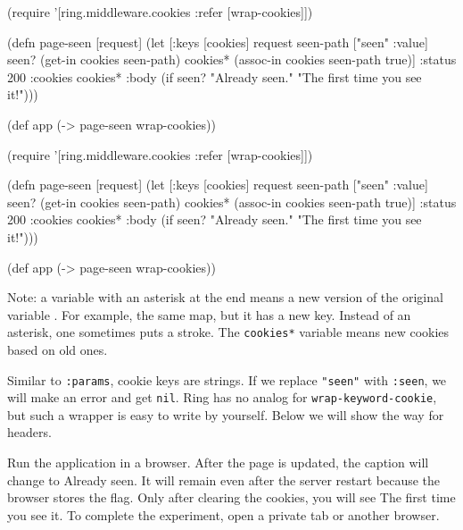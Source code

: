 
\ifx\DEVICETYPE\MOBILE

\begin{english}
  \begin{clojure/lines}
(require '[ring.middleware.cookies
           :refer [wrap-cookies]])

(defn page-seen [request]
  (let [{:keys [cookies]} request
        seen-path ["seen" :value]
        seen? (get-in cookies
                      seen-path)
        cookies* (assoc-in cookies
                   seen-path true)]
    {:status 200
     :cookies cookies*
     :body
     (if seen?
      "Already seen."
      "The first time you see it!")}))

(def app (-> page-seen
             wrap-cookies))
  \end{clojure/lines}
\end{english}

\else

\begin{english}
  \begin{clojure/lines}
(require '[ring.middleware.cookies
           :refer [wrap-cookies]])

(defn page-seen [request]
  (let [{:keys [cookies]} request
        seen-path ["seen" :value]
        seen? (get-in cookies seen-path)
        cookies* (assoc-in cookies seen-path true)]
    {:status 200
     :cookies cookies*
     :body (if seen?
             "Already seen."
             "The first time you see it!")}))

(def app (-> page-seen
             wrap-cookies))
  \end{clojure/lines}
\end{english}

\fi

Note: a variable with an asterisk at the end means a new version of the original variable . For example, the same map, but it has a new key. Instead of an asterisk, one sometimes puts a stroke. The \verb|cookies*| variable means new cookies based on old ones.


Similar to \verb|:params|, cookie keys are strings. If we replace \verb|"seen"| with \verb|:seen|, we will make an error and get \verb|nil|. Ring has no analog for \verb|wrap-keyword-cookie|, but such a wrapper is easy to write by yourself. Below we will show the way for headers.

Run the application in a browser. After the page is updated, the caption will change to Already seen. It will remain even after the server restart because the browser stores the flag. Only after clearing the cookies, you will see The first time you see it. To complete the experiment, open a private tab or another browser.

